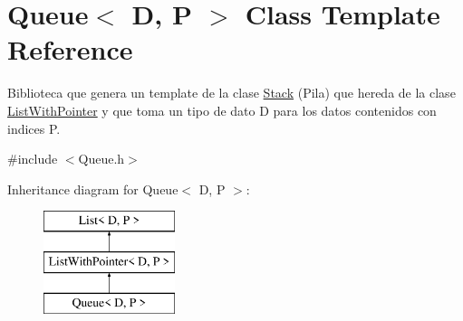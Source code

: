 \hypertarget{class_queue}{\section{Queue$<$ D, P $>$ Class Template Reference}
\label{class_queue}
}


Biblioteca que genera un template de la clase \hyperlink{class_stack}{Stack} (Pila) que hereda de la clase \hyperlink{class_list_with_pointer}{List\+With\+Pointer} y que toma un tipo de dato D para los datos contenidos con indices P.  




{\ttfamily \#include $<$Queue.\+h$>$}

Inheritance diagram for Queue$<$ D, P $>$\+:\begin{figure}[H]
\begin{center}
\leavevmode
\includegraphics[height=3.000000cm]{class_queue}
\end{center}
\end{figure}

